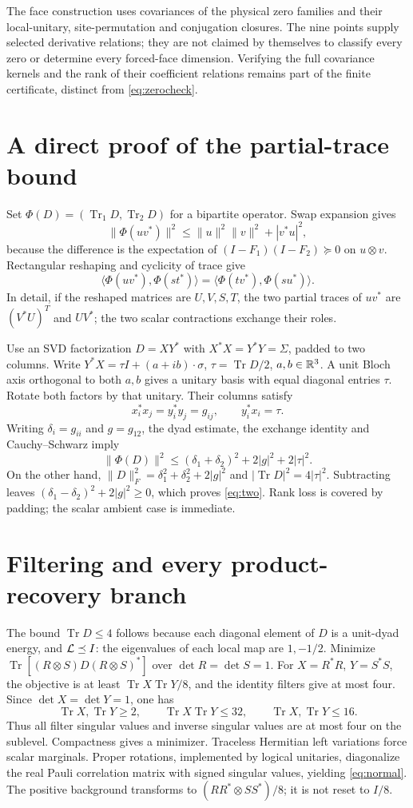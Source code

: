 \documentclass[11pt,a4paper]{article}
\theoremstyle{definition}\newtheorem{definition}[theorem]{Definition}
\theoremstyle{remark}\newtheorem{remark}[theorem]{Remark}
\DeclareMathOperator{\Tr}{Tr}\DeclareMathOperator{\rank}{rank}
\newcommand{\ip}[2]{\langle#1,#2\rangle}
\numberwithin{equation}{section}
\begin{document}
The face construction uses covariances of the physical zero families
and their local-unitary, site-permutation and conjugation closures.
The nine points supply selected derivative relations; they are not
claimed by themselves to classify every zero or determine every
forced-face dimension. Verifying the full covariance kernels and
the rank of their coefficient relations remains part of the
finite certificate, distinct from \eqref{eq:zerocheck}.

\section{A direct proof of the partial-trace bound}\label{app:two}
Set $\Phi(D)=(\Tr_1D,\Tr_2D)$ for a bipartite operator.
Swap expansion gives
\[
\|\Phi(uv^*)\|^2\le\|u\|^2\|v\|^2+|v^*u|^2,
\]
because the difference is the expectation of
$(I-F_1)(I-F_2)\succeq0$ on $u\otimes v$.
Rectangular reshaping and cyclicity of trace give
\[
\ip{\Phi(uv^*)}{\Phi(st^*)}
=\ip{\Phi(tv^*)}{\Phi(su^*)}.
\]
In detail, if the reshaped matrices are $U,V,S,T$, the two partial
traces of $uv^*$ are $(V^*U)^T$ and $UV^*$; the two scalar
contractions exchange their roles.

Use an SVD factorization $D=XY^*$ with
$X^*X=Y^*Y=\Sigma$, padded to two columns.
Write $Y^*X=\tau I+(a+ib)\cdot\sigma$,
$\tau=\Tr D/2$, $a,b\in\mathbb R^3$.
A unit Bloch axis orthogonal to both $a,b$ gives a unitary basis
with equal diagonal entries $\tau$. Rotate both factors by that
unitary. Their columns satisfy
\[
x_i^*x_j=y_i^*y_j=g_{ij},\qquad y_i^*x_i=\tau.
\]
Writing $\delta_i=g_{ii}$ and $g=g_{12}$, the dyad estimate,
the exchange identity and Cauchy--Schwarz imply
\[
\|\Phi(D)\|^2\le
(\delta_1+\delta_2)^2+2|g|^2+2|\tau|^2.
\]
On the other hand,
$\|D\|_F^2=\delta_1^2+\delta_2^2+2|g|^2$ and
$|\Tr D|^2=4|\tau|^2$.
Subtracting leaves $(\delta_1-\delta_2)^2+2|g|^2\ge0$,
which proves \eqref{eq:two}. Rank loss is covered by padding;
the scalar ambient case is immediate.

\section{Filtering and every product-recovery branch}\label{app:filter}
The bound $\Tr D\le4$ follows because each diagonal element of $D$
is a unit-dyad energy, and $\mathcal L\preceq I$:
the eigenvalues of each local map are $1,-1/2$.
Minimize $\Tr[(R\otimes S)D(R\otimes S)^*]$ over
$\det R=\det S=1$.
For $X=R^*R$, $Y=S^*S$, the objective is at least
$\Tr X\Tr Y/8$, and the identity filters give at most four.
Since $\det X=\det Y=1$, one has
\[
\Tr X,\Tr Y\ge2,\qquad
\Tr X\Tr Y\le32,\qquad
\Tr X,\Tr Y\le16.
\]
Thus all filter singular values and inverse singular values are
at most four on the sublevel. Compactness gives a minimizer.
Traceless Hermitian left variations force scalar marginals.
Proper rotations, implemented by logical unitaries, diagonalize
the real Pauli correlation matrix with signed singular values,
yielding \eqref{eq:normal}.
The positive background transforms to
$(RR^*\otimes SS^*)/8$; it is not reset to $I/8$.
\end{document}
